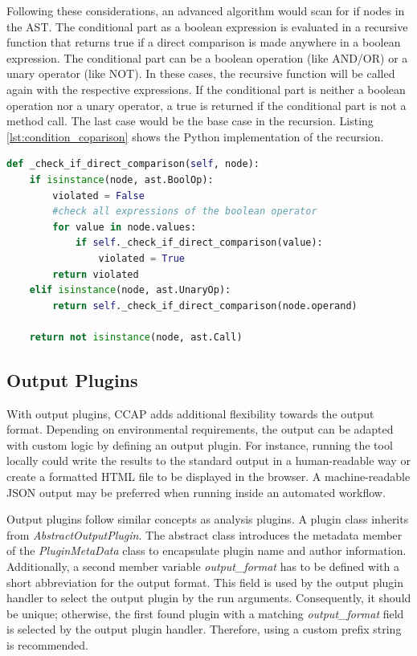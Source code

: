 Following these considerations, an advanced algorithm would scan for if nodes in the AST. The conditional part as a boolean expression is evaluated in a recursive function that returns true if a direct comparison is made anywhere in a boolean expression.
The conditional part can be a boolean operation (like AND/OR) or a unary operator (like NOT).  In these cases, the recursive function will be called again with the respective expressions. If the conditional part is neither a boolean operation nor a unary operator, a true is returned if the conditional part is not a method call. The last case would be the base case in the recursion. Listing \ref{lst:condition_coparison} shows the Python implementation of the recursion.
\begin{minipage}[c]{\linewidth}
\begin{lstlisting}[language=Python, label=lst:condition_coparison, caption={Recursive function to analyse an if statement for direct comparisons. Since a condition should contain a method call, the function returns False if this is not the case.}]
def _check_if_direct_comparison(self, node):
    if isinstance(node, ast.BoolOp):
        violated = False
        #check all expressions of the boolean operator
        for value in node.values:
            if self._check_if_direct_comparison(value):
                violated = True
        return violated
    elif isinstance(node, ast.UnaryOp):
        return self._check_if_direct_comparison(node.operand)

    return not isinstance(node, ast.Call)\end{lstlisting}
\end{minipage}

\subsection{Output Plugins}
With output plugins, CCAP adds additional flexibility towards the output format. Depending on environmental requirements, the output can be adapted with custom logic by defining an output plugin. For instance, running the tool locally could write the results to the standard output in a human-readable way or create a formatted HTML file to be displayed in the browser. A machine-readable JSON output may be preferred when running inside an automated workflow.

Output plugins follow similar concepts as analysis plugins. A plugin class inherits from \textit{AbstractOutputPlugin}. The abstract class introduces the metadata member of the \textit{PluginMetaData} class to encapsulate plugin name and author information. Additionally, a second member variable \textit{output\_format} has to be defined with a short abbreviation for the output format. This field is used by the output plugin handler to select the output plugin by the run arguments. Consequently, it should be unique; otherwise, the first found plugin with a matching \textit{output\_format} field is selected by the output plugin handler. Therefore, using a custom prefix string is recommended.

